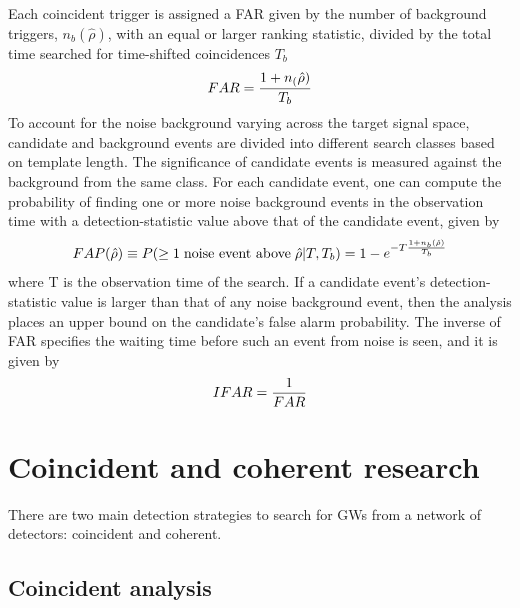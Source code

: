 \documentclass[binding=0.6cm, LaM]{sapthesis}
\begin{document}
	Each coincident trigger is assigned a FAR given by the number 
	of background triggers, $n_b(\hat \rho)$, with an equal or larger ranking statistic, 
	divided by the total time searched for time-shifted coincidences $T_b$
		\begin{equation}
			FAR = {{1 + n_(\hat \rho)} \over {T_b}}
		\end{equation}
	To account for the noise background varying across the target signal space, 
	candidate and background events are divided into different search classes based on template length. 
	The significance of candidate events is measured against the background from the same class. 
	For each candidate event, one can compute the probability of finding one or more 
	noise background events in the observation time with a detection-statistic value above that of the candidate event, given by 
		\begin{equation}
			FAP(\hat \rho) \equiv P(\geq 1 \hspace*{0.1cm}\text{noise event above}\hspace*{0.1cm} \hat \rho|T,T_b) = 1 - e^{-T{{1+n_b(\hat \rho)} \over{T_b}}}
		\end{equation}
	where T is the observation time of the search.
	If a candidate event’s detection-statistic value is larger 
	than that of any noise background event, 
	then the analysis places an upper bound on the candidate’s false alarm probability. 
	The inverse of FAR specifies the waiting time before such an event from noise is seen, and it is given by 
		\begin{equation}
			IFAR = {1 \over {FAR}}
		\end{equation}   
\section{Coincident and coherent research}

	There are two main detection strategies to search for GWs 	
	from a network of detectors: coincident and coherent.

\subsection{Coincident analysis}
\end{document}
